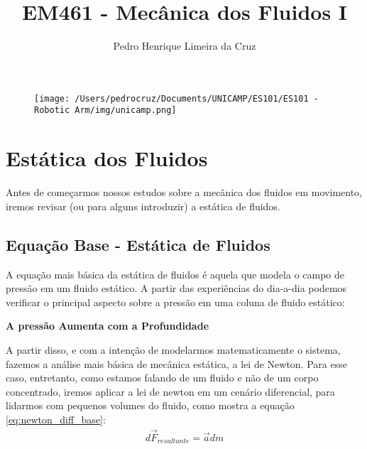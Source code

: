 \documentclass{article}
\author{Pedro Henrique Limeira da Cruz}
\title{EM461 - Mecânica dos Fluidos I}
\begin{document}
    \maketitle
    \thispagestyle{empty}

    \begin{figure}[h]
        \begin{center}
            \texttt{[image: /Users/pedrocruz/Documents/UNICAMP/ES101/ES101 - Robotic Arm/img/unicamp.png]}
        \end{center}
    \end{figure}

    \newpage
    \tableofcontents
    \newpage

    \section{Estática dos Fluidos}
        Antes de começarmos nossos estudos sobre a mecânica dos fluidos em movimento, iremos revisar (ou para alguns introduzir) a estática de fluidos. 

        \subsection{Equação Base - Estática de Fluidos}
            A equação mais básica da estática de fluidos é aquela que modela o campo de pressão em um fluido estático. A partir das experiências do dia-a-dia podemos verificar o principal aspecto
            sobre a pressão em uma coluna de fluido estático: 

            \begin{center}
                \textbf{A pressão Aumenta com a Profundidade}
            \end{center}

            A partir disso, e com a intenção de modelarmos matematicamente o sistema, fazemos a análise mais básica de mecânica estática, a lei de Newton. Para esse caso, entretanto, como estamos
            falando de um fluido e não de um corpo concentrado, iremos aplicar a lei de newton em um cenário diferencial, para lidarmos com pequenos volumes do fluido, como mostra a equação \ref{eq:newton_diff_base}:
            \begin{align}
                d\vec{F}_{resultante}= \vec a dm \label{eq:newton_diff_base}
            \end{align}
\end{document}
